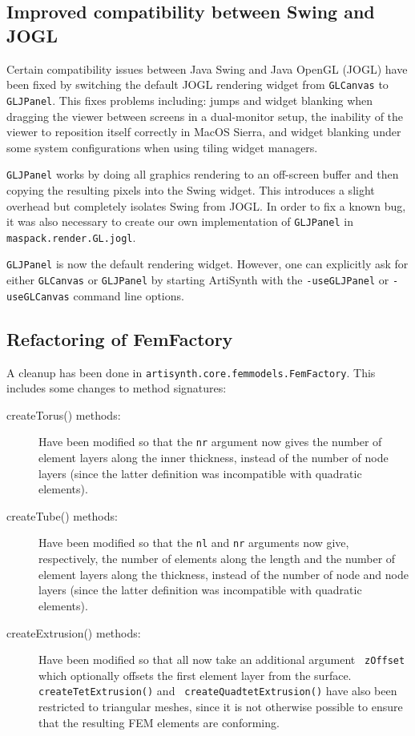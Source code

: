\documentclass{article}
\begin{document}
\subsection*{Improved compatibility between Swing and JOGL}

Certain compatibility issues between Java Swing and Java OpenGL (JOGL)
have been fixed by switching the default JOGL rendering widget from
{\tt GLCanvas} to {\tt GLJPanel}. This fixes problems including: jumps
and widget blanking when dragging the viewer between screens in a
dual-monitor setup, the inability of the viewer to reposition itself
correctly in MacOS Sierra, and widget blanking under some system
configurations when using tiling widget managers.

{\tt GLJPanel} works by doing all graphics rendering to an off-screen
buffer and then copying the resulting pixels into the Swing widget.
This introduces a slight overhead but completely isolates Swing from
JOGL. In order to fix a known bug, it was also necessary to create our
own implementation of {\tt GLJPanel} in {\tt maspack.render.GL.jogl}.

{\tt GLJPanel} is now the default rendering widget. However, one can
explicitly ask for either {\tt GLCanvas} or {\tt GLJPanel} by starting
ArtiSynth with the {\tt -useGLJPanel} or {\tt -useGLCanvas} command
line options.

\subsection*{Refactoring of FemFactory}

A cleanup has been done in {\tt artisynth.core.femmodels.FemFactory}.
This includes some changes to method signatures:

\begin{description}

\item[createTorus() methods:]\mbox{}

Have been modified so that the {\tt nr} argument now gives the
number of element layers along the inner thickness, instead of the
number of node layers (since the latter definition was incompatible
with quadratic elements).

\item[createTube() methods:]\mbox{}

Have been modified so that the {\tt nl} and {\tt nr} arguments now
give, respectively, the number of elements along the length and the
number of element layers along the thickness, instead of the number of
node and node layers (since the latter definition was incompatible
with quadratic elements).

\item[createExtrusion() methods:]\mbox{}

Have been modified so that all now take an additional argument {\tt
zOffset} which optionally offsets the first element layer from the
surface.  {\tt createTetExtrusion()} and {\tt
createQuadtetExtrusion()} have also been restricted to triangular
meshes, since it is not otherwise possible to ensure that the
resulting FEM elements are conforming.

\end{description}
\end{document}
